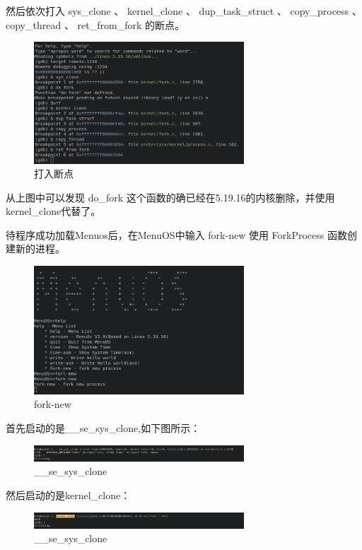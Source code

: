\documentclass[lang=cn,10pt]{elegantbook}
\begin{document}
然后依次打入 sys\_clone 、 kernel\_clone 、 dup\_task\_struct 、 copy\_process 、copy\_thread 、 ret\_from\_fork 的断点。
\begin{figure}[htbp]
  \centering
  \includegraphics[width=0.7\textwidth]{image/image-20231107213842226.png}
  \caption{打入断点}
\end{figure}

从上图中可以发现 do\_fork 这个函数的确已经在5.19.16的内核删除，并使用kernel\_clone代替了。

\newpage
待程序成功加载Menuos后，在MenuOS中输入 fork-new 使用 ForkProcess 函数创建新的进程。
\begin{figure}[htbp]
  \centering
  \includegraphics[width=0.7\textwidth]{image/image-20231107214310340.png}
  \caption{fork-new}
\end{figure}

首先启动的是\_\_se\_sys\_clone,如下图所示：
\begin{figure}[htbp]
  \centering
  \includegraphics[width=0.7\textwidth]{image/image-20231107215732335.png}
  \caption{\_\_se\_sys\_clone}
\end{figure}

然后启动的是kernel\_clone：
\begin{figure}[htbp]
  \centering
  \includegraphics[width=0.7\textwidth]{image/image-20231107215834035.png}
  \caption{\_\_se\_sys\_clone}
\end{figure}
\end{document}
